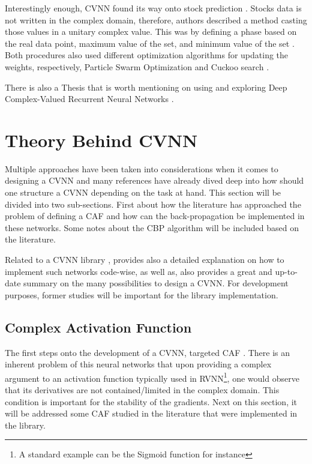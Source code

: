 Interestingly enough, \gls{CVNN} found its way onto stock prediction \parencite{jia2018stockpredcvnn, wang2017cvnnstockprediction}. Stocks data is not written in the complex domain, therefore, authors described a method casting those values in a unitary complex value. This was by defining a phase based on the real data point, maximum value of the set, and minimum value of the set \parencite{wang2021emmiteridcvnn}. Both procedures also used different optimization algorithms for updating the weights, respectively,  Particle Swarm Optimization \parencite{eberhart1995particle} and Cuckoo search \parencite{yang2014cuckoo}.

There is also a Thesis that is worth mentioning on using and exploring Deep Complex-Valued Recurrent Neural Networks \parencite{monning2019deep}.

\section{Theory Behind \gls{CVNN}}

Multiple approaches have been taken into considerations when it comes to designing a \gls{CVNN} and many references have already dived deep into how should one structure a \gls{CVNN} depending on the task at hand. This section will be divided into two sub-sections. First about how the literature has approached the problem of defining a \gls{CAF} and how can the back-propagation be implemented in these networks. Some notes about the \gls{CBP} algorithm will be included based on the literature.

Related to a \gls{CVNN} library \parencite{barrachina2023theory}, provides also a detailed explanation on how to implement such networks code-wise, as well as, \parencite{abdalla2023newtheory} also provides a great and up-to-date summary on the many possibilities to design a \gls{CVNN}. For development purposes, former studies will be important for the library implementation.

\subsection{Complex Activation Function}
\label{sec:CAF}
The first steps onto the development of  a \gls{CVNN}, targeted \gls{CAF} \parencite{clarke1990definition, georgiou1992fullfunc}. There is an inherent problem of this neural networks that upon providing a complex argument to an activation function typically used in \gls{RVNN}\footnote{A standard example can be the Sigmoid function for instance}, one would observe that its derivatives are not contained/limited in the complex domain. This condition is important for the stability of the gradients. Next on this section, it will be addressed some \gls{CAF} studied in the literature that were implemented in the library.

